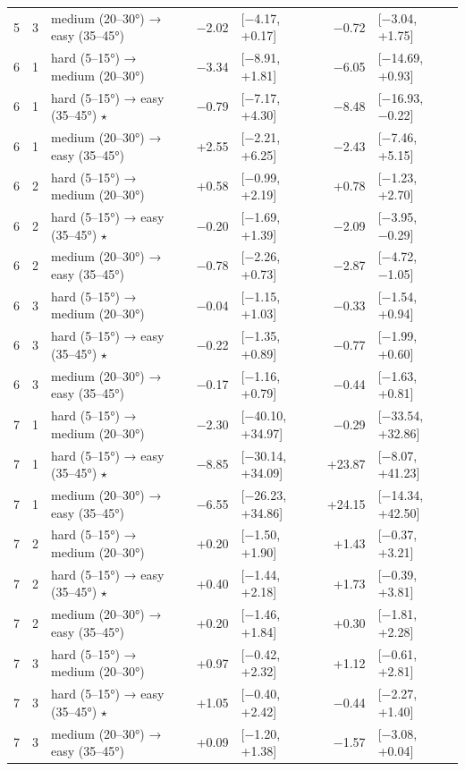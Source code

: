 \begin{table}[htbp]
\begin{tabular}{rllrlrl}
    5 & 3 & medium (20–30°) → easy (35–45°) & −2.02 & [−4.17, +0.17] & −0.72 & [−3.04, +1.75] \\
    6 & 1 & hard (5–15°) → medium (20–30°) & −3.34 & [−8.91, +1.81] & −6.05 & [−14.69, +0.93] \\
    6 & 1 & hard (5–15°) → easy (35–45°) $\star$ & −0.79 & [−7.17, +4.30] & −8.48 & [−16.93, −0.22] \\
    6 & 1 & medium (20–30°) → easy (35–45°) & +2.55 & [−2.21, +6.25] & −2.43 & [−7.46, +5.15] \\
    6 & 2 & hard (5–15°) → medium (20–30°) & +0.58 & [−0.99, +2.19] & +0.78 & [−1.23, +2.70] \\
    6 & 2 & hard (5–15°) → easy (35–45°) $\star$ & −0.20 & [−1.69, +1.39] & −2.09 & [−3.95, −0.29] \\
    6 & 2 & medium (20–30°) → easy (35–45°) & −0.78 & [−2.26, +0.73] & −2.87 & [−4.72, −1.05] \\
    6 & 3 & hard (5–15°) → medium (20–30°) & −0.04 & [−1.15, +1.03] & −0.33 & [−1.54, +0.94] \\
    6 & 3 & hard (5–15°) → easy (35–45°) $\star$ & −0.22 & [−1.35, +0.89] & −0.77 & [−1.99, +0.60] \\
    6 & 3 & medium (20–30°) → easy (35–45°) & −0.17 & [−1.16, +0.79] & −0.44 & [−1.63, +0.81] \\
    7 & 1 & hard (5–15°) → medium (20–30°) & −2.30 & [−40.10, +34.97] & −0.29 & [−33.54, +32.86] \\
    7 & 1 & hard (5–15°) → easy (35–45°) $\star$ & −8.85 & [−30.14, +34.09] & +23.87 & [−8.07, +41.23] \\
    7 & 1 & medium (20–30°) → easy (35–45°) & −6.55 & [−26.23, +34.86] & +24.15 & [−14.34, +42.50] \\
    7 & 2 & hard (5–15°) → medium (20–30°) & +0.20 & [−1.50, +1.90] & +1.43 & [−0.37, +3.21] \\
    7 & 2 & hard (5–15°) → easy (35–45°) $\star$ & +0.40 & [−1.44, +2.18] & +1.73 & [−0.39, +3.81] \\
    7 & 2 & medium (20–30°) → easy (35–45°) & +0.20 & [−1.46, +1.84] & +0.30 & [−1.81, +2.28] \\
    7 & 3 & hard (5–15°) → medium (20–30°) & +0.97 & [−0.42, +2.32] & +1.12 & [−0.61, +2.81] \\
    7 & 3 & hard (5–15°) → easy (35–45°) $\star$ & +1.05 & [−0.40, +2.42] & −0.44 & [−2.27, +1.40] \\
    7 & 3 & medium (20–30°) → easy (35–45°) & +0.09 & [−1.20, +1.38] & −1.57 & [−3.08, +0.04] \\

\end{tabular}
\end{table}
